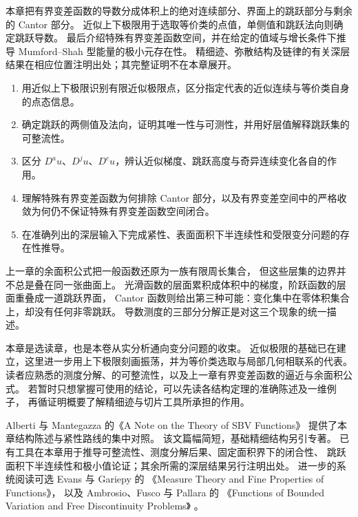 \begin{chapterabstract}
本章把有界变差函数的导数分成体积上的绝对连续部分、界面上的跳跃部分与剩余的 Cantor 部分。
近似上下极限用于选取等价类的点值，单侧值和跳跃法向则确定跳跃导数。
最后介绍特殊有界变差函数空间，并在给定的值域与增长条件下推导 Mumford–Shah 型能量的极小元存在性。
精细迹、弥散结构及链律的有关深层结果在相应位置注明出处；其完整证明不在本章展开。
\end{chapterabstract}

\begin{learninggoals}
\begin{enumerate}
\item 用近似上下极限识别有限近似极限点，区分指定代表的近似连续与等价类自身的点态信息。
\item 确定跳跃的两侧值及法向，证明其唯一性与可测性，并用好层值解释跳跃集的可整流性。
\item 区分 \(D^au\)、\(D^ju\)、\(D^cu\)，辨认近似梯度、跳跃高度与奇异连续变化各自的作用。
\item 理解特殊有界变差函数为何排除 Cantor 部分，以及有界变差空间中的严格收敛为何仍不保证特殊有界变差函数空间闭合。
\item 在准确列出的深层输入下完成紧性、表面面积下半连续性和受限变分问题的存在性推导。
\end{enumerate}
\end{learninggoals}

上一章的余面积公式把一般函数还原为一族有限周长集合，
但这些层集的边界并不总是叠在同一张曲面上。
光滑函数的层面累积成体积中的梯度，阶跃函数的层面重叠成一道跳跃界面，
Cantor 函数则给出第三种可能：变化集中在零体积集合上，却没有任何非零跳跃。
导数测度的三部分分解正是对这三个现象的统一描述。

\ProseParagraphBreak

本章是选读章，也是本卷从实分析通向变分问题的收束。
近似极限的基础已在建立，这里进一步用上下极限刻画振荡，并为等价类选取与局部几何相联系的代表。
读者应熟悉的测度分解、的可整流性，以及上一章有界变差函数的逼近与余面积公式。
若暂时只想掌握可使用的结论，可以先读各结构定理的准确陈述及一维例子，
再循证明概要了解精细迹与切片工具所承担的作用。

\ProseParagraphBreak

Alberti 与 Mantegazza 的《A Note on the Theory of SBV Functions》%
\cite{AlbertiMantegazza1997SBV}提供了本章结构陈述与紧性路线的集中对照。
该文篇幅简短，基础精细结构另引专著。
已有工具在本章用于推导可整流性、测度分解后果、固定面积界下的闭合性、
跳跃面积下半连续性和极小值论证；其余所需的深层结果另行注明出处。
进一步的系统阅读可选 Evans 与 Gariepy 的%
《Measure Theory and Fine Properties of Functions》\cite{Evans2015Measure}，
以及 Ambrosio、Fusco 与 Pallara 的%
《Functions of Bounded Variation and Free Discontinuity Problems》%
\cite{Ambrosio2000Functions}。

